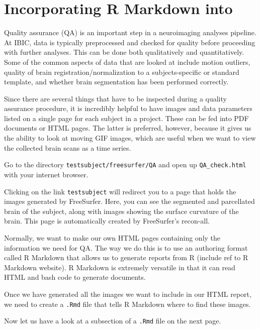 \section{Incorporating R Markdown into \maken{}}
Quality assurance (QA) is an important step in a neuroimaging analyses pipeline. At IBIC, data is typically  preprocessed and checked for quality before proceeding with further analyses. This can be done both qualitatively and quantitatively. Some of the common aspects of data that are looked at include motion outliers, quality of brain registration/normalization to a subjects-specific or standard template, and whether brain segmentation has been performed correctly. 

Since there are several things that have to be inspected during a quality assurance procedure, it is incredibly helpful to have images and data parameters listed on a single page for each subject in a project. These can be fed into PDF documents or HTML pages. The latter is preferred, however, because it gives us the ability to look at moving GIF images, which are useful when we want to view the collected brain scans as a time series. 

Go to the directory \texttt{testsubject/freesurfer/QA} and open up \texttt{QA_check.html} with your internet browser. 

Clicking on the link \texttt{testsubject} will redirect you to a page that holds the images generated by FreeSurfer. Here, you can see the segmented and parcellated brain of the subject, along with images showing the surface curvature of the brain. This page is automatically created by FreeSurfer's recon-all.

Normally, we want to make our own HTML pages containing only the information we need for QA. The way we do this is to use an authoring format called R Markdown that allows us to generate reports from R (include ref to R Markdown website). R Markdown is extremely versatile in that it can read HTML and bash code to generate documents. 

Once we have generated all the images we want to include in our HTML report, we need to create a \texttt{.Rmd} file that tells R Markdown where to find these images. 

Now let us have a look at a subsection of a \texttt{.Rmd} file on the next page.
\clearpage

